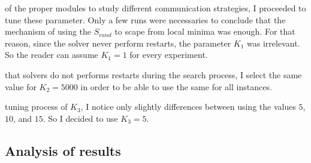 of the proper modules to study different communication strategies, I proceeded to tune these parameter. Only a few runs were necessaries to conclude that the mechanism of using the \om{} $S_{rand}$ to scape from local minima was enough. For that reason, since the solver never perform restarts, the parameter $K_1$ was irrelevant. So the reader can assume $K_1 = 1$ for every experiment.

 that solvers do not performs restarts during the search process, I select the same value for $K_2 = 5000$ in order to be able to use the same \as{} for all instances.

tuning process of $K_3$, I notice only slightly differences between using the values $5$, $10$, and $15$. So I decided to use $K_3 = 5$.











































\subsection{Analysis of results}


